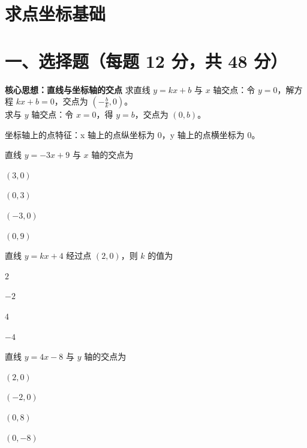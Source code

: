 \documentclass{exam-zh}
\begin{document}
\section*{求点坐标基础}

\section*{一、选择题（每题 12 分，共 48 分）}



\begin{keyideabox}
  \textbf{核心思想：直线与坐标轴的交点}
  求直线 $y=kx+b$ 与 $x$ 轴交点：令 $y=0$，解方程 $kx+b=0$，交点为 $\left(-\frac{b}{k}, 0\right)$。\\ 求与 $y$ 轴交点：令 $x=0$，得 $y=b$，交点为 $(0, b)$。
\par\small 坐标轴上的点特征：x 轴上的点纵坐标为 0，y 轴上的点横坐标为 0。\end{keyideabox}



\begin{question}[points=12]
  直线 $y = -3x + 9$ 与 $x$ 轴的交点为
  \begin{choices}
    \item $(3, 0)$
    \item $(0, 3)$
    \item $(-3, 0)$
    \item $(0, 9)$
  \end{choices}
\end{question}



\begin{question}[points=12]
  直线 $y = kx + 4$ 经过点 $(2, 0)$，则 $k$ 的值为
  \begin{choices}
    \item $2$
    \item $-2$
    \item $4$
    \item $-4$
  \end{choices}
\end{question}



\begin{question}[points=12]
  直线 $y = 4x - 8$ 与 $y$ 轴的交点为
  \begin{choices}
    \item $(2, 0)$
    \item $(-2, 0)$
    \item $(0, 8)$
    \item $(0, -8)$
  \end{choices}
\end{question}
\end{document}
